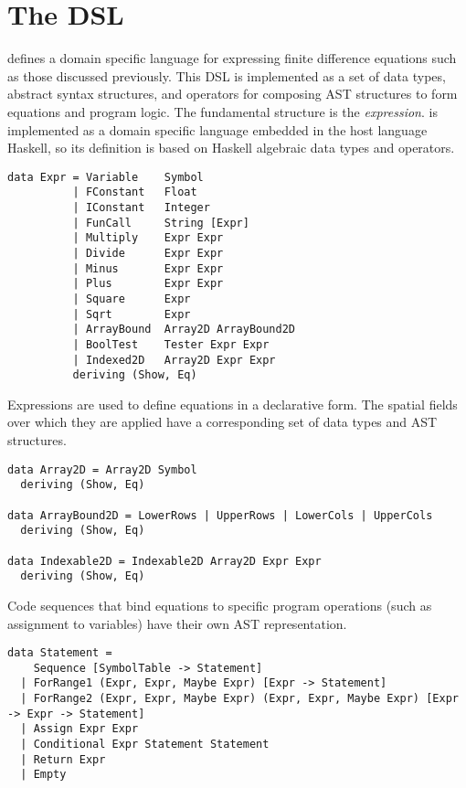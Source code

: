 \section{The \FIDDLE DSL}

\FIDDLE defines a domain specific language for expressing finite difference
equations such as those discussed previously.  This DSL
is implemented as a set of data types, abstract syntax structures, and operators for
composing AST structures to form equations and program logic.  The fundamental
structure is the \emph{expression}.  \FIDDLE is implemented as a domain specific language
embedded in the host language Haskell, so its definition is based on Haskell algebraic
data types and operators.

\begin{lstlisting}
data Expr = Variable    Symbol
          | FConstant   Float
          | IConstant   Integer
          | FunCall     String [Expr]
          | Multiply    Expr Expr
          | Divide      Expr Expr
          | Minus       Expr Expr
          | Plus        Expr Expr
          | Square      Expr
          | Sqrt        Expr
          | ArrayBound  Array2D ArrayBound2D
          | BoolTest    Tester Expr Expr
          | Indexed2D   Array2D Expr Expr
          deriving (Show, Eq)
\end{lstlisting}

Expressions are used to define equations in a declarative form.  The spatial fields
over which they are applied have a corresponding set of data types and AST
structures.

\begin{lstlisting}
data Array2D = Array2D Symbol
  deriving (Show, Eq)

data ArrayBound2D = LowerRows | UpperRows | LowerCols | UpperCols
  deriving (Show, Eq)

data Indexable2D = Indexable2D Array2D Expr Expr
  deriving (Show, Eq)
\end{lstlisting}

Code sequences that bind equations to specific program operations (such as
assignment to variables) have their own AST representation.

\begin{lstlisting}
data Statement = 
    Sequence [SymbolTable -> Statement]
  | ForRange1 (Expr, Expr, Maybe Expr) [Expr -> Statement]
  | ForRange2 (Expr, Expr, Maybe Expr) (Expr, Expr, Maybe Expr) [Expr -> Expr -> Statement]
  | Assign Expr Expr
  | Conditional Expr Statement Statement
  | Return Expr
  | Empty
\end{lstlisting}

